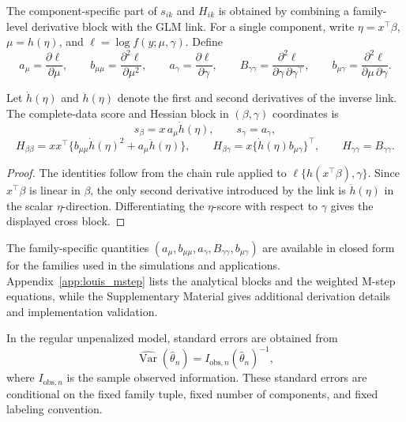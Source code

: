 The component-specific part of \(s_{ik}\) and \(H_{ik}\) is obtained by
combining a family-level derivative block with the GLM link.  For a single
component, write \(\eta=x^\top\beta\), \(\mu=h(\eta)\), and
\(\ell=\log f(y;\mu,\gamma)\).  Define
\[
    a_\mu=\frac{\partial \ell}{\partial\mu},\qquad
    b_{\mu\mu}=\frac{\partial^2\ell}{\partial\mu^2},\qquad
    a_\gamma=\frac{\partial\ell}{\partial\gamma},\qquad
    B_{\gamma\gamma}=\frac{\partial^2\ell}{\partial\gamma\,\partial\gamma^\top},
    \qquad
    b_{\mu\gamma}=\frac{\partial^2\ell}{\partial\mu\,\partial\gamma}.
\]

\begin{proposition}
\label{prop:louis_chain_rule}
Let \(\dot h(\eta)\) and \(\ddot h(\eta)\) denote the first and second
derivatives of the inverse link.  The complete-data score and Hessian block in
\((\beta,\gamma)\) coordinates is
\[
    s_\beta=x\,a_\mu\dot h(\eta),
    \qquad
    s_\gamma=a_\gamma,
\]
\[
    H_{\beta\beta}
    =
    xx^\top\{b_{\mu\mu}\dot h(\eta)^2+a_\mu\ddot h(\eta)\},
    \qquad
    H_{\beta\gamma}
    =
    x\{\dot h(\eta)b_{\mu\gamma}\}^\top,
    \qquad
    H_{\gamma\gamma}=B_{\gamma\gamma}.
\]
\end{proposition}

\begin{proof}
The identities follow from the chain rule applied to
\(\ell\{h(x^\top\beta),\gamma\}\).  Since \(x^\top\beta\) is linear in
\(\beta\), the only second derivative introduced by the link is
\(\ddot h(\eta)\) in the scalar \(\eta\)-direction.  Differentiating the
\(\eta\)-score with respect to \(\gamma\) gives the displayed cross block.
\end{proof}

The family-specific quantities
\((a_\mu,b_{\mu\mu},a_\gamma,B_{\gamma\gamma},b_{\mu\gamma})\) are available in
closed form for the families used in the simulations and applications.
Appendix~\ref{app:louis_mstep} lists the analytical blocks and the weighted
M-step equations, while the Supplementary Material gives additional derivation
details and implementation validation.

In the regular unpenalized model, standard errors are obtained from
\[
    \widehat{\operatorname{Var}}(\hat\theta_n)
    =
    I_{\mathrm{obs},n}(\hat\theta_n)^{-1},
\]
where \(I_{\mathrm{obs},n}\) is the sample observed information.  These standard
errors are conditional on the fixed family tuple, fixed number of components,
and fixed labeling convention.

